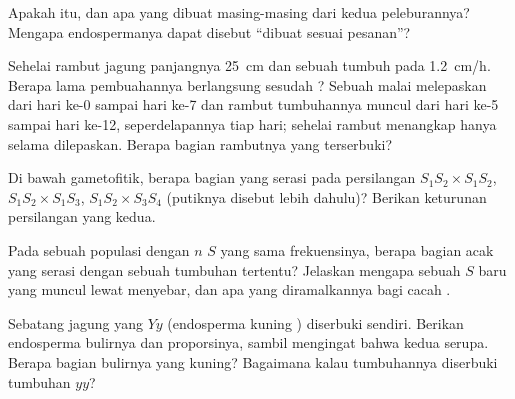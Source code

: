 \begin{exercise}[$\star$]\label{exo:b2:angiosperm-reproduction:4}
Apakah  itu, dan apa yang dibuat masing-masing dari
kedua peleburannya? Mengapa endospermanya dapat disebut ``dibuat sesuai
pesanan''?
\end{exercise}

\begin{exercise}[$\star\star$]\label{exo:b2:angiosperm-reproduction:5}
Sehelai rambut jagung panjangnya \qty{25}{cm} dan sebuah  tumbuh pada \qty{1.2}{cm/h}. Berapa lama pembuahannya berlangsung
sesudah ? Sebuah malai melepaskan  dari hari ke-0
sampai hari ke-7 dan rambut tumbuhannya muncul dari hari ke-5 sampai
hari ke-12, seperdelapannya tiap hari; sehelai rambut menangkap  hanya selama  dilepaskan. Berapa bagian rambutnya
yang terserbuki?
\end{exercise}

\begin{exercise}[$\star\star$]\label{exo:b2:angiosperm-reproduction:6}
Di bawah  gametofitik, berapa bagian 
yang serasi pada persilangan $S_1S_2\times S_1S_2$, $S_1S_2\times
S_1S_3$, $S_1S_2\times S_3S_4$ (putiknya disebut lebih dahulu)?
Berikan  keturunan persilangan yang kedua.
\end{exercise}

\begin{exercise}[$\star\star$]\label{exo:b2:angiosperm-reproduction:7}
Pada sebuah populasi dengan $n$  $S$ yang sama frekuensinya, berapa
bagian  acak yang serasi dengan sebuah tumbuhan tertentu?
Jelaskan mengapa sebuah  $S$ baru yang muncul lewat  menyebar,
dan apa yang diramalkannya bagi cacah .
\end{exercise}

\begin{exercise}[$\star\star$]\label{exo:b2:angiosperm-reproduction:8}
Sebatang jagung yang  $Yy$ (endosperma kuning )
diserbuki sendiri. Berikan  endosperma bulirnya dan
proporsinya, sambil mengingat bahwa kedua  serupa. Berapa
bagian bulirnya yang kuning? Bagaimana kalau tumbuhannya diserbuki
tumbuhan $yy$?
\end{exercise}

